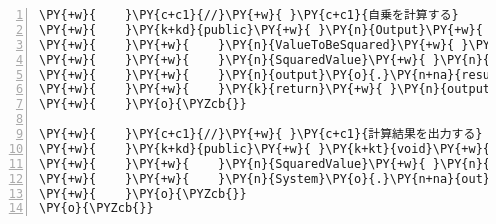 \begin{Verbatim}[commandchars=\\\{\},numbers=left,firstnumber=1,stepnumber=1,frame=single,fontsize=\small]
\PY{+w}{    }\PY{c+c1}{//}\PY{+w}{ }\PY{c+c1}{自乗を計算する}
\PY{+w}{    }\PY{k+kd}{public}\PY{+w}{ }\PY{n}{Output}\PY{+w}{ }\PY{n+nf}{process}\PY{o}{(}\PY{n}{Input}\PY{+w}{ }\PY{n}{input}\PY{o}{)}\PY{+w}{ }\PY{o}{\PYZob{}}
\PY{+w}{    }\PY{+w}{    }\PY{n}{ValueToBeSquared}\PY{+w}{ }\PY{n}{vtbs}\PY{+w}{ }\PY{o}{=}\PY{o}{(}\PY{n}{ValueToBeSquared}\PY{o}{)}\PY{+w}{ }\PY{n}{input}\PY{o}{;}
\PY{+w}{    }\PY{+w}{    }\PY{n}{SquaredValue}\PY{+w}{ }\PY{n}{output}\PY{+w}{ }\PY{o}{=}\PY{+w}{ }\PY{k}{new}\PY{+w}{ }\PY{n}{SquaredValue}\PY{o}{(}\PY{o}{)}\PY{o}{;}
\PY{+w}{    }\PY{+w}{    }\PY{n}{output}\PY{o}{.}\PY{n+na}{result}\PY{+w}{ }\PY{o}{=}\PY{+w}{ }\PY{n}{vtbs}\PY{o}{.}\PY{n+na}{value}\PY{+w}{ }\PY{o}{*}\PY{+w}{ }\PY{n}{vtbs}\PY{o}{.}\PY{n+na}{value}\PY{o}{;}
\PY{+w}{    }\PY{+w}{    }\PY{k}{return}\PY{+w}{ }\PY{n}{output}\PY{o}{;}
\PY{+w}{    }\PY{o}{\PYZcb{}}

\PY{+w}{    }\PY{c+c1}{//}\PY{+w}{ }\PY{c+c1}{計算結果を出力する}
\PY{+w}{    }\PY{k+kd}{public}\PY{+w}{ }\PY{k+kt}{void}\PY{+w}{ }\PY{n+nf}{output}\PY{o}{(}\PY{n}{Output}\PY{+w}{ }\PY{n}{output}\PY{o}{)}\PY{+w}{ }\PY{o}{\PYZob{}}
\PY{+w}{    }\PY{+w}{    }\PY{n}{SquaredValue}\PY{+w}{ }\PY{n}{sv}\PY{+w}{ }\PY{o}{=}\PY{+w}{ }\PY{o}{(}\PY{n}{SquaredValue}\PY{o}{)}\PY{+w}{ }\PY{n}{output}\PY{o}{;}
\PY{+w}{    }\PY{+w}{    }\PY{n}{System}\PY{o}{.}\PY{n+na}{out}\PY{o}{.}\PY{n+na}{println}\PY{o}{(}\PY{l+s}{"計算結果："}\PY{+w}{ }\PY{o}{+}\PY{+w}{ }\PY{n}{sv}\PY{o}{.}\PY{n+na}{result}\PY{o}{)}\PY{o}{;}
\PY{+w}{    }\PY{o}{\PYZcb{}}
\PY{o}{\PYZcb{}}
\end{Verbatim}
